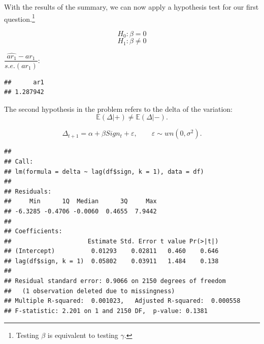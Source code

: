 \documentclass[11pt, a4paper]{report}
\newenvironment{Shaded}{\begin{snugshade}}{\end{snugshade}}
\newcommand{\DataTypeTok}[1]{\textcolor[rgb]{0.13,0.29,0.53}{#1}}
\newcommand{\DecValTok}[1]{\textcolor[rgb]{0.00,0.00,0.81}{#1}}
\newcommand{\KeywordTok}[1]{\textcolor[rgb]{0.13,0.29,0.53}{\textbf{#1}}}
\newcommand{\NormalTok}[1]{#1}
\newcommand{\OperatorTok}[1]{\textcolor[rgb]{0.81,0.36,0.00}{\textbf{#1}}}
\newcommand{\StringTok}[1]{\textcolor[rgb]{0.31,0.60,0.02}{#1}}
\theoremstyle{plain}
\theoremstyle{plain}
\theoremstyle{remark}
\begin{document}
With the results of the summary, we can now apply a hypothesis test for
our first
question.\footnote{Testing $\beta$ is equivalent to testing $\gamma$.}

\[ H_0: \beta = 0\] \[H_1: \beta \neq 0\]

\(\dfrac{\hat{ar_1} - ar_1}{s.e.(ar_1)}\):

\begin{Shaded}
\end{Shaded}

\begin{verbatim}
##      ar1 
## 1.287942
\end{verbatim}

The second hypothesis in the problem refers to the delta of the
variation: \[\mathbb{E}(\Delta | + ) \neq \mathbb{E}(\Delta | - ).\]

\[\Delta_{t+1} = \alpha + \beta Sign_t + \varepsilon, \hspace{2em} \varepsilon \sim wn(0, \sigma^2).\]

\begin{Shaded}
\end{Shaded}

\begin{verbatim}
## 
## Call:
## lm(formula = delta ~ lag(df$sign, k = 1), data = df)
## 
## Residuals:
##     Min      1Q  Median      3Q     Max 
## -6.3285 -0.4706 -0.0060  0.4655  7.9442 
## 
## Coefficients:
##                     Estimate Std. Error t value Pr(>|t|)
## (Intercept)          0.01293    0.02811   0.460    0.646
## lag(df$sign, k = 1)  0.05802    0.03911   1.484    0.138
## 
## Residual standard error: 0.9066 on 2150 degrees of freedom
##   (1 observation deleted due to missingness)
## Multiple R-squared:  0.001023,   Adjusted R-squared:  0.000558 
## F-statistic: 2.201 on 1 and 2150 DF,  p-value: 0.1381
\end{verbatim}
\end{document}
